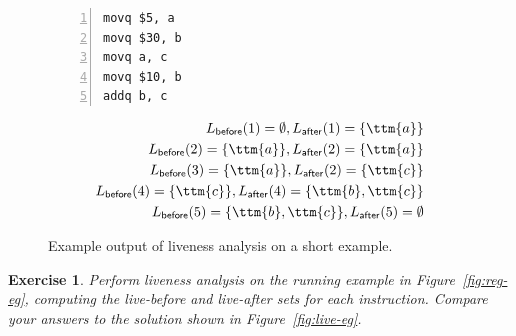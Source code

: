 \documentclass[7x10]{TimesAPriori_MIT}%
\newtheorem{exercise}[theorem]{Exercise}
\begin{document}
\begin{figure}[tbp]
\begin{minipage}{0.45\textwidth}
\begin{lstlisting}[numbers=left,numberstyle=\tiny]
movq $5, a
movq $30, b
movq a, c
movq $10, b
addq b, c
\end{lstlisting}
\end{minipage}
\vrule\hspace{10pt}
\begin{minipage}{0.45\textwidth}
\begin{align*}
L_{\mathsf{before}}(1)=  \emptyset, 
L_{\mathsf{after}}(1)=  \{\ttm{a}\}\\
L_{\mathsf{before}}(2)=  \{\ttm{a}\},
L_{\mathsf{after}}(2)=  \{\ttm{a}\}\\
L_{\mathsf{before}}(3)=  \{\ttm{a}\},
L_{\mathsf{after}}(2)=  \{\ttm{c}\}\\
L_{\mathsf{before}}(4)=  \{\ttm{c}\},
L_{\mathsf{after}}(4)=  \{\ttm{b},\ttm{c}\}\\
L_{\mathsf{before}}(5)=  \{\ttm{b},\ttm{c}\},
L_{\mathsf{after}}(5)=  \emptyset
\end{align*}
\end{minipage}
\caption{Example output of liveness analysis on a short example.}
\label{fig:liveness-example-0}
\end{figure}

\begin{exercise}\normalfont
  Perform liveness analysis on the running example in
  Figure~\ref{fig:reg-eg}, computing the live-before and live-after
  sets for each instruction. Compare your answers to the solution
  shown in Figure~\ref{fig:live-eg}.
\end{exercise}
\end{document}
